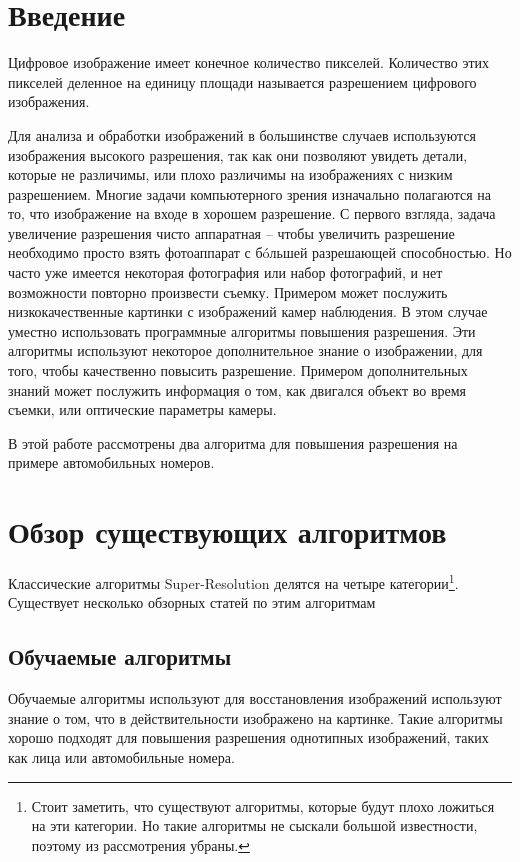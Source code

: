 \section{Введение}
Цифровое изображение имеет конечное количество пикселей. Количество этих пикселей деленное на единицу площади называется
разрешением цифрового изображения.

Для анализа и обработки изображений в большинстве случаев используются изображения высокого разрешения, так как они
позволяют увидеть детали, которые не различимы, или плохо различимы на изображениях с низким разрешением. Многие задачи
компьютерного зрения изначально полагаются на то, что изображение на входе в хорошем разрешение. С первого взгляда,
задача увеличение разрешения чисто аппаратная -- чтобы увеличить разрешение необходимо просто взять фотоаппарат с
б\'oльшей разрешающей способностью. Но часто уже имеется некоторая фотография или набор фотографий, и нет возможности
повторно произвести съемку. Примером может послужить низкокачественные картинки с изображений камер наблюдения. В этом
случае уместно использовать программные алгоритмы повышения разрешения. Эти алгоритмы используют некоторое
дополнительное знание о изображении, для того, чтобы качественно повысить разрешение. Примером дополнительных знаний
может послужить информация о том, как двигался объект во время съемки, или оптические параметры камеры.

В этой работе рассмотрены два алгоритма для повышения разрешения на примере автомобильных номеров.

\section{Обзор существующих алгоритмов} Классические алгоритмы Super-Resolution делятся на четыре
категории\footnote{Стоит заметить, что существуют алгоритмы, которые будут плохо ложиться на эти категории. Но такие
алгоритмы не сыскали большой известности, поэтому из рассмотрения убраны.}.  Существует несколько обзорных статей по
этим алгоритмам \cite{ParkS.C.2003,tian2011survey}

\subsection{Обучаемые алгоритмы}
Обучаемые алгоритмы используют для восстановления изображений используют знание о том, что в действительности изображено
на картинке. Такие алгоритмы хорошо подходят для повышения разрешения однотипных изображений, таких как лица или
автомобильные номера.

